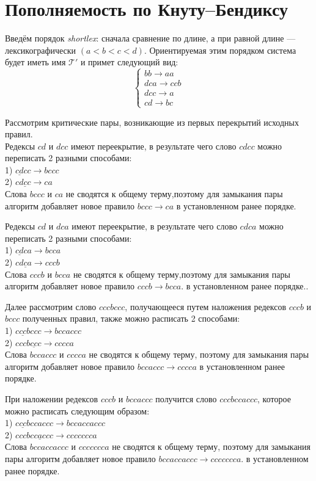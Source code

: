 \documentclass[12pt,a4paper]{article}
\begin{document}
\section*{Пополняемость по Кнуту–Бендиксу}
Введём порядок \emph{shortlex}: сначала сравнение по длине, а при равной длине — лексикографически \((a<b<c<d)\).
Ориентируемая этим порядком система будет иметь имя \(\mathcal{T}'\) и примет следующий вид:
\[
\begin{cases}
bb \to aa\\
dca \to ccb\\
dcc \to a\\
cd \to bc
\end{cases}
\]

Рассмотрим критические пары, возникающие из первых перекрытий исходных правил.\\
Редексы \(cd\) и \(dcc\) имеют переекрытие, в результате чего слово \(cdcc\) можно переписать 2 разными способами:\\
1) \(\underline{cd}cc \to bccc\)\\
2) \(c\underline{dcc} \to ca\)\\
Слова \(bccc\) и \(ca\) не сводятся к общему терму,поэтому для замыкания пары алгоритм добавляет новое правило \(bccc \to ca\) в установленном ранее порядке.

Редексы \(cd\) и \(dca\) имеют переекрытие, в результате чего слово \(cdca\) можно переписать 2 разными способами:\\
1) \(\underline{cd}ca \to bcca\)\\
2) \(c\underline{dca} \to cccb\)\\
Слова \(cccb\) и \(bcca\) не сводятся к общему терму,поэтому для замыкания пары алгоритм добавляет новое правило \(cccb \to bcca\). в установленном ранее порядке..

Далее рассмотрим слово \(cccbccc\), получающееся путем наложения редексов \(cccb\) и \(bccc\) полученных правил, также можно расписать 2 способами:\\
1) \(\underline{cccb}ccc \to bccaccc\)\\
2) \(ccc\underline{bccc} \to cccca\)\\
Слова \(bccaccc\) и \(cccca\) не сводятся к общему терму, поэтому для замыкания пары алгоритм добавляет новое правило \(bccaccc \to cccca\) в установленном ранее порядке.

При наложении редексов \(cccb\) и \(bccaccc\) получится слово \(cccbccaccc\), которое можно расписать следующим образом:\\
1) \(\underline{cccb}ccaccc \to bccaccaccc\)\\
2) \(ccc\underline{bccaccc} \to ccccccca\)\\
Слова \(bccaccaccc\) и \(ccccccca\) не сводятся к общему терму, поэтому для замыкания пары алгоритм добавляет новое правило \(bccaccaccc \to ccccccca\). в установленном ранее порядке.
\end{document}
